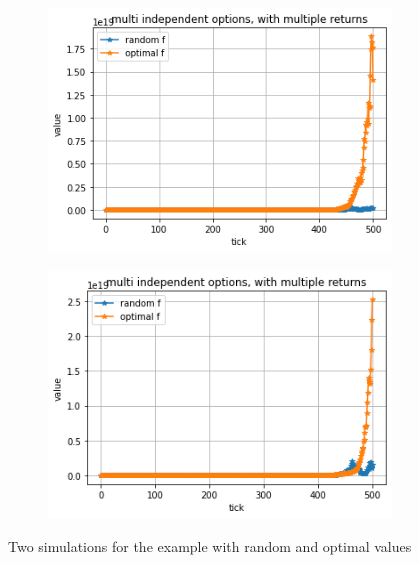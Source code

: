 \documentclass{article}
\begin{document}
		\begin{figure}[!h]
		\begin{subfigure}{0.525\textwidth}
			\includegraphics[width=0.9\linewidth]{example1} 
		\end{subfigure}
		\begin{subfigure}{0.525\textwidth}
			\includegraphics[width=0.9\linewidth]{example2}
		\end{subfigure}
		\caption{Two simulations for the example with random and optimal values}
		\label{Fig:example1}
	\end{figure}
\end{document}
